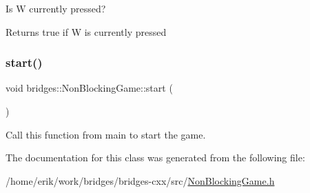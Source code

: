 Is W currently pressed? 

\begin{DoxyReturn}{Returns}
true if W is currently pressed 
\end{DoxyReturn}
\mbox{\label{classbridges_1_1_non_blocking_game_acb77c3a60ec27e422e9da8f479214b55}} 
\subsubsection{\texorpdfstring{start()}{start()}}
{\footnotesize\ttfamily void bridges\+::\+Non\+Blocking\+Game\+::start (\begin{DoxyParamCaption}{ }\end{DoxyParamCaption})\hspace{0.3cm}{\ttfamily [inline]}}



Call this function from main to start the game. 



The documentation for this class was generated from the following file\+:\begin{DoxyCompactItemize}
\item 
/home/erik/work/bridges/bridges-\/cxx/src/\hyperlink{_non_blocking_game_8h}{Non\+Blocking\+Game.\+h}\end{DoxyCompactItemize}
